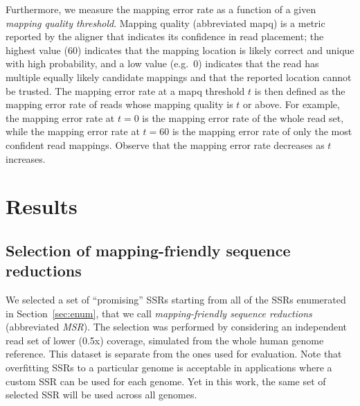 \documentclass[
  11pt,
  twoside,
  BCOR=10mm,
  listof=totoc]{scrbook}
\begin{document}
Furthermore, we measure the mapping error rate as a function of a given \emph{mapping quality threshold}. Mapping quality (abbreviated mapq) is a metric reported by the aligner that indicates its confidence in read placement; the highest value (60) indicates that the mapping location is likely correct and unique with high probability, and a low value (e.g.~0) indicates that the read has multiple equally likely candidate mappings and that the reported location cannot be trusted. The mapping error rate at a mapq threshold \(t\) is then defined as the mapping error rate of reads whose mapping quality is \(t\) or above. For example, the mapping error rate at \(t=0\) is the mapping error rate of the whole read set, while the mapping error rate at \(t=60\) is the mapping error rate of only the most confident read mappings. Observe that the mapping error rate decreases as \(t\) increases.

\hypertarget{hpc-results}{%
\section{Results}\label{hpc-results}}

\hypertarget{selection-of-mapping-friendly-sequence-reductions}{%
\subsection{Selection of mapping-friendly sequence reductions}\label{selection-of-mapping-friendly-sequence-reductions}}

We selected a set of ``promising'' SSRs starting from all of the SSRs enumerated in Section~\ref{sec:enum}, that we call \emph{mapping-friendly sequence reductions} (abbreviated \emph{MSR}). The selection was performed by considering an independent read set of lower (0.5x) coverage, simulated from the whole human genome reference. This dataset is separate from the ones used for evaluation. Note that overfitting SSRs to a particular genome is acceptable in applications where a custom SSR can be used for each genome. Yet in this work, the same set of selected SSR will be used across all genomes.
\end{document}
